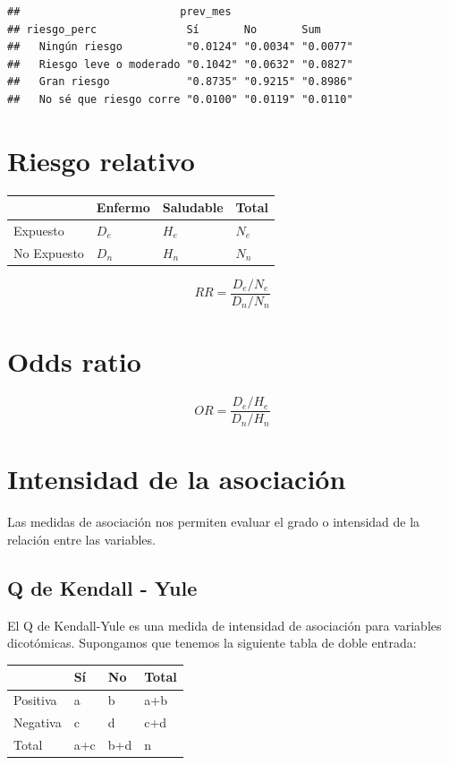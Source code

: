 \documentclass[spanish,]{book}
\begin{document}
\begin{verbatim}
##                         prev_mes
## riesgo_perc              Sí       No       Sum     
##   Ningún riesgo          "0.0124" "0.0034" "0.0077"
##   Riesgo leve o moderado "0.1042" "0.0632" "0.0827"
##   Gran riesgo            "0.8735" "0.9215" "0.8986"
##   No sé que riesgo corre "0.0100" "0.0119" "0.0110"
\end{verbatim}

\section{Riesgo relativo}\label{riesgo-relativo}

\begin{longtable}[]{@{}llll@{}}
\toprule
& Enfermo & Saludable & Total\tabularnewline
\midrule
\endhead
Expuesto & \(D_e\) & \(H_e\) & \(N_e\)\tabularnewline
No Expuesto & \(D_n\) & \(H_n\) & \(N_n\)\tabularnewline
\bottomrule
\end{longtable}

\[
RR = \frac{D_e/N_e}{D_n/N_n}
\]

\section{Odds ratio}\label{odds-ratio}

\[
OR = \frac{D_e/H_e}{D_n/H_n}
\]

\section{Intensidad de la asociación}\label{intensidad-de-la-asociacion}

Las medidas de asociación nos permiten evaluar el grado o intensidad de
la relación entre las variables.

\subsection{Q de Kendall - Yule}\label{q-de-kendall---yule}

El Q de Kendall-Yule es una medida de intensidad de asociación para
variables dicotómicas. Supongamos que tenemos la siguiente tabla de
doble entrada:

\begin{table}[H]
\centering
\begin{tabular}{l|l|l|l}
\hline
  & Sí & No & Total\\
\hline
Positiva & a & b & a+b\\
\hline
Negativa & c & d & c+d\\
\hline
Total & a+c & b+d & n\\
\hline
\end{tabular}
\end{table}
\end{document}
